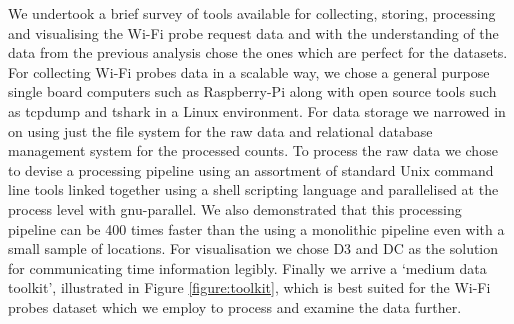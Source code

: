 We undertook a brief survey of tools available for collecting, storing, processing and visualising the Wi-Fi probe request data and with the understanding of the data from the previous analysis chose the ones which are perfect for the datasets.
For collecting Wi-Fi probes data in a scalable way, we chose a general purpose single board computers such as Raspberry-Pi along with open source tools such as tcpdump and tshark in a Linux environment.
For data storage we narrowed in on using just the file system for the raw data and relational database management system for the processed counts.
To process the raw data we chose to devise a processing pipeline using an assortment of standard Unix command line tools linked together using a shell scripting language and parallelised at the process level with gnu-parallel.
We also demonstrated that this processing pipeline can be 400 times faster than the using a monolithic pipeline even with a small sample of locations.
For visualisation we chose D3 and DC as the solution for communicating time information legibly.
Finally we arrive a `medium data toolkit', illustrated in Figure \ref{figure:toolkit}, which is best suited for the Wi-Fi probes dataset which we employ to process and examine the data further.
